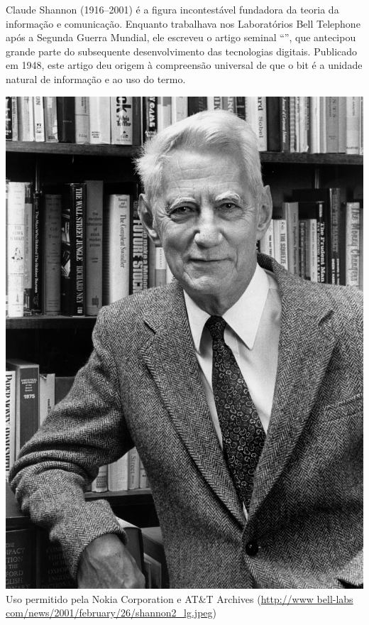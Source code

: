 \begin{tcolorbox}[title={Claude Shannon}]
\begin{minipage}[t]{0.5\linewidth}
\vspace*{0pt}
Claude Shannon (1916--2001) é a figura incontestável fundadora da teoria da
informação e comunicação. Enquanto trabalhava nos Laboratórios Bell Telephone 
após a Segunda Guerra Mundial, ele escreveu o artigo seminal ``'', que antecipou grande parte do
subsequente desenvolvimento das tecnologias digitais. Publicado em 1948, este
artigo deu origem à compreensão universal de que o bit é a unidade natural de
informação e ao uso do termo.
\end{minipage}\hfill%
\begin{minipage}[t]{0.46\linewidth}
\vspace*{0pt}
\label{fig:shannon}
\vspace{-0.3cm}
\includegraphics[width=\linewidth]{imagens/shannon.jpeg}
\\%
\scriptsize{Uso permitido pela Nokia Corporation e AT\&T Archives
(\url{http://www bell-labs com/news/2001/february/26/shannon2_lg.jpeg})}
\end{minipage}
\end{tcolorbox}

